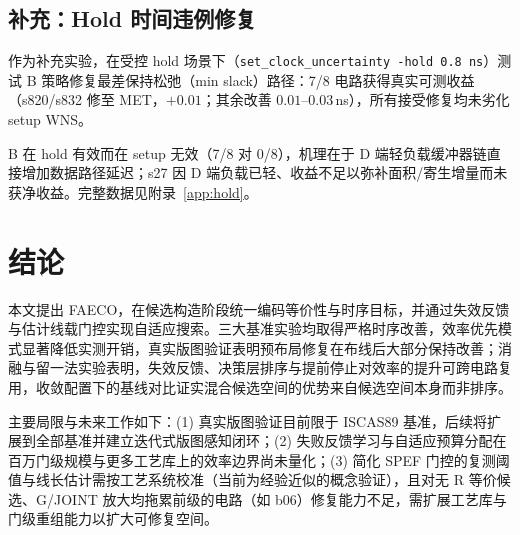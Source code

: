 \documentclass[journal]{IEEEtran}
\begin{document}
\subsection{补充：Hold 时间违例修复}\label{sec:hold}

作为补充实验，在受控 hold 场景下（\texttt{set\_clock\_uncertainty -hold 0.8\,ns}）测试 B 策略修复最差保持松弛（min slack）路径：7/8 电路获得真实可测收益（s820/s832 修至 MET，$+0.01$；其余改善 $0.01$--$0.03\,$ns），所有接受修复均未劣化 setup WNS。

B 在 hold 有效而在 setup 无效（7/8 对 0/8），机理在于 D 端轻负载缓冲器链直接增加数据路径延迟；s27 因 D 端负载已轻、收益不足以弥补面积/寄生增量而未获净收益。完整数据见附录~\ref{app:hold}。

\section{结论}\label{sec:conclusion}

本文提出 FAECO，在候选构造阶段统一编码等价性与时序目标，并通过失效反馈与估计线载门控实现自适应搜索。三大基准实验均取得严格时序改善，效率优先模式显著降低实测开销，真实版图验证表明预布局修复在布线后大部分保持改善；消融与留一法实验表明，失效反馈、决策层排序与提前停止对效率的提升可跨电路复用，收敛配置下的基线对比证实混合候选空间的优势来自候选空间本身而非排序。

主要局限与未来工作如下：(1) 真实版图验证目前限于 ISCAS89 基准，后续将扩展到全部基准并建立迭代式版图感知闭环；(2) 失败反馈学习与自适应预算分配在百万门级规模与更多工艺库上的效率边界尚未量化；(3) 简化 SPEF 门控的复测阈值与线长估计需按工艺系统校准（当前为经验近似的概念验证），且对无 R 等价候选、G/JOINT 放大均拖累前级的电路（如 b06）修复能力不足，需扩展工艺库与门级重组能力以扩大可修复空间。
\end{document}
